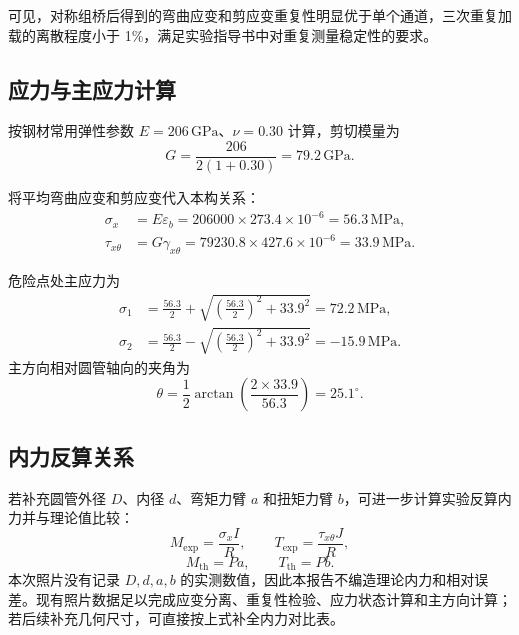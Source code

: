 \documentclass[UTF8,a4paper,10pt]{ctexart}
\begin{document}
可见，对称组桥后得到的弯曲应变和剪应变重复性明显优于单个通道，三次重复加载的离散程度小于 1\%，满足实验指导书中对重复测量稳定性的要求。

\subsection{应力与主应力计算}

按钢材常用弹性参数 $E=206\,\mathrm{GPa}$、$\nu=0.30$ 计算，剪切模量为
\begin{equation}
    G=\frac{206}{2(1+0.30)}=79.2\,\mathrm{GPa}.
\end{equation}

将平均弯曲应变和剪应变代入本构关系：
\begin{align}
    \sigma_x &= E\varepsilon_b
    =206000\times 273.4\times10^{-6}
    =56.3\,\mathrm{MPa},\\
    \tau_{x\theta} &= G\gamma_{x\theta}
    =79230.8\times 427.6\times10^{-6}
    =33.9\,\mathrm{MPa}.
\end{align}

危险点处主应力为
\begin{align}
    \sigma_1
    &=\frac{56.3}{2}+\sqrt{\left(\frac{56.3}{2}\right)^2+33.9^2}
    =72.2\,\mathrm{MPa},\\
    \sigma_2
    &=\frac{56.3}{2}-\sqrt{\left(\frac{56.3}{2}\right)^2+33.9^2}
    =-15.9\,\mathrm{MPa}.
\end{align}
主方向相对圆管轴向的夹角为
\begin{equation}
    \theta=\frac12\arctan\left(\frac{2\times33.9}{56.3}\right)
    =25.1^\circ .
\end{equation}

\subsection{内力反算关系}

若补充圆管外径 $D$、内径 $d$、弯矩力臂 $a$ 和扭矩力臂 $b$，可进一步计算实验反算内力并与理论值比较：
\begin{equation}
    M_{\mathrm{exp}}=\frac{\sigma_x I}{R},\qquad
    T_{\mathrm{exp}}=\frac{\tau_{x\theta} J}{R},
\end{equation}
\begin{equation}
    M_{\mathrm{th}}=Pa,\qquad T_{\mathrm{th}}=Pb.
\end{equation}
本次照片没有记录 $D,d,a,b$ 的实测数值，因此本报告不编造理论内力和相对误差。现有照片数据足以完成应变分离、重复性检验、应力状态计算和主方向计算；若后续补充几何尺寸，可直接按上式补全内力对比表。
\end{document}
